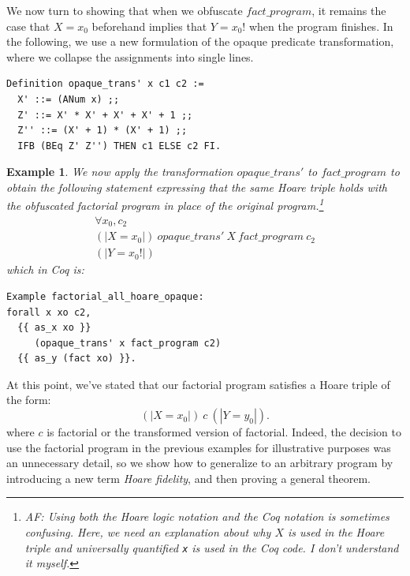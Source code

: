 \documentclass[compsoc,conference,a4paper,10pt,times]{IEEEtran}
\newtheorem{example}[theorem]{Example}
\begin{document}
We now turn to showing that when we obfuscate $\textit{fact\_program}$, it remains the case that $X = x_0$ beforehand implies that $Y = x_0!$ when the program finishes.
In the following, we use a new formulation of the opaque predicate transformation, where we collapse the assignments into single lines.
\begin{verbatim}
Definition opaque_trans' x c1 c2 :=
  X' ::= (ANum x) ;;
  Z' ::= X' * X' + X' + X' + 1 ;;
  Z'' ::= (X' + 1) * (X' + 1) ;;
  IFB (BEq Z' Z'') THEN c1 ELSE c2 FI.
\end{verbatim}

\begin{example}\label{hoarel2}
    We now apply the transformation $opaque\_trans'$ to $fact\_program$ to obtain the following statement expressing that the same Hoare triple holds with the obfuscated factorial program in place of the original program.\footnote{AF: Using both the Hoare logic notation and the Coq notation is sometimes confusing.  Here, we need an explanation about why $X$ is used in the Hoare triple and universally quantified \texttt{x} is used in the Coq code. I don't understand it myself.}
    \[
    \begin{array}{l}
    \forall x_0, c_2\\
    (|X=x_0|)\ opaque\_trans'\ X\ fact\_program\ c_2\\ (|Y=x_0!|)
    \end{array}
    \]
    which in Coq is:
\begin{verbatim}
Example factorial_all_hoare_opaque: 
forall x xo c2,
  {{ as_x xo }} 
     (opaque_trans' x fact_program c2) 
  {{ as_y (fact xo) }}.
\end{verbatim}
\end{example}

At this point, we've stated that our factorial program satisfies a Hoare triple of the form:
\[ (| X = x_0 |)\ c\ (| Y = y_0 |). \]
%
where $c$ is factorial or the transformed version of factorial.  Indeed, the decision to use the factorial program in the previous examples for illustrative purposes was an unnecessary detail, so we  show how to generalize to an arbitrary program by introducing a new term \emph{Hoare fidelity}, and then proving a general theorem.
\end{document}
